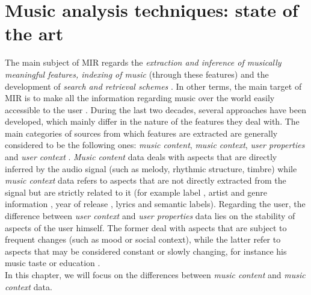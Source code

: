 \chapter{Music analysis techniques: state of the art} 
\label{Chapter2} 

The main subject of MIR regards the \textit{extraction and inference of musically meaningful features, indexing of music} (through these features) and the development of \textit{search and retrieval schemes} \cite{downieMIR}. In other terms, the main target of MIR is to make all the information regarding music over the world easily accessible to the user \cite{downieMIR}. During the last two decades, several approaches have been developed, which mainly differ in the nature of the features they deal with. The main categories of sources from which features are extracted are generally considered to be the following ones: \textit{music content}, \textit{music context}, \textit{user properties} and \textit{user context} \cite{gomez14}. \textit{Music content} data deals with aspects that are directly inferred by the audio signal (such as melody, rhythmic structure, timbre) while \textit{music context} data refers to aspects that are not directly extracted from the signal but are strictly related to it (for example label \cite{pachet00}, artist and genre information \cite{perfe11} \cite{aizenberg12}, year of release \cite{vangulik05}, lyrics \cite{coelho13} and semantic labels). Regarding the user, the difference between \textit{user context} and \textit{user properties} data lies on the stability of aspects of the user himself. The former deal with aspects that are subject to frequent changes (such as mood or social context), while the latter refer to aspects that may be considered constant or slowly changing, for instance his music taste or education \cite{gomez14}. \\In this chapter, we will focus on the differences between \textit{music content} and \textit{music context} data. 


